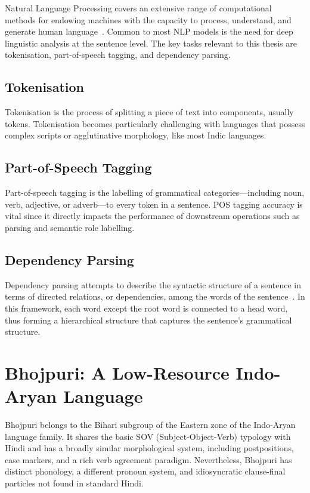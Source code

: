 \documentclass[12pt,a4paper,oneside]{report}
\newcommand{\bho}{Bhojpuri}
\newcommand{\hi}{Hindi}
\begin{document}
Natural Language Processing covers an extensive range of computational methods for
endowing machines with the capacity to process, understand, and generate human
language~\citep{jurafsky2023}. Common to most NLP models is the need for deep
linguistic analysis at the sentence level. The key tasks relevant to this thesis are
tokenisation, part-of-speech tagging, and dependency parsing.

\subsection{Tokenisation}
Tokenisation is the process of splitting a piece of text into components, usually tokens.
Tokenisation becomes particularly challenging with languages that possess complex
scripts or agglutinative morphology, like most Indic languages.

\subsection{Part-of-Speech Tagging}
Part-of-speech tagging is the labelling of grammatical categories---including noun,
verb, adjective, or adverb---to every token in a sentence. POS tagging accuracy is
vital since it directly impacts the performance of downstream operations such as
parsing and semantic role labelling.

\subsection{Dependency Parsing}
\label{sec:dep_parsing}

Dependency parsing attempts to describe the syntactic structure of a sentence in terms
of directed relations, or dependencies, among the words of the sentence~\citep{tesniere1959}.
In this framework, each word except the root word is connected to a head word, thus
forming a hierarchical structure that captures the sentence's grammatical structure.

\section{Bhojpuri: A Low-Resource Indo-Aryan Language}

\bho{} belongs to the Bihari subgroup of the Eastern zone of the Indo-Aryan language
family. It shares the basic SOV (Subject-Object-Verb) typology with \hi{} and has
a broadly similar morphological system, including postpositions, case markers,
and a rich verb agreement paradigm. Nevertheless, \bho{} has distinct phonology,
a different pronoun system, and idiosyncratic clause-final particles not found in
standard \hi{}.
\end{document}
